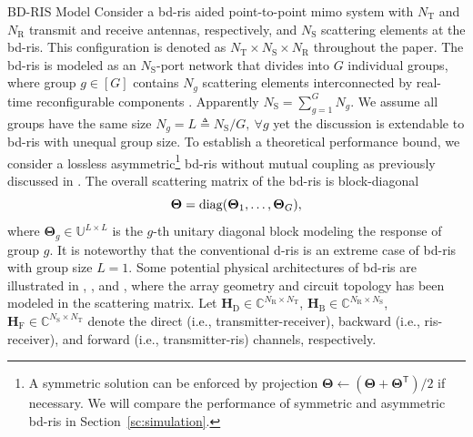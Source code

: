 	\begin{section}{BD-RIS Model}
	Consider a \gls{bd}-\gls{ris} aided point-to-point \gls{mimo} system with $N_\mathrm{T}$ and $N_\mathrm{R}$ transmit and receive antennas, respectively, and $N_\mathrm{S}$ scattering elements at the \gls{bd}-\gls{ris}.
	This configuration is denoted as $N_\mathrm{T} \times N_\mathrm{S} \times N_\mathrm{R}$ throughout the paper.
	The \gls{bd}-\gls{ris} is modeled as an $N_\mathrm{S}$-port network \cite{Ivrlac2010} that divides into $G$ individual groups, where group $g \in [G]$ contains $N_g$ scattering elements interconnected by real-time reconfigurable components \cite{Shen2020a}.
	Apparently $N_\mathrm{S} = \sum_{g=1}^G N_g$.
	We assume all groups have the same size $N_g = L \triangleq N_\mathrm{S} / G, \ \forall g$ yet the discussion is extendable to \gls{bd}-\gls{ris} with unequal group size.
	To establish a theoretical performance bound, we consider a lossless asymmetric\footnote{A symmetric solution can be enforced by projection $\mathbf{\Theta} \gets (\mathbf{\Theta} + \mathbf{\Theta}^\mathsf{T})/2$ if necessary. We will compare the performance of symmetric and asymmetric \gls{bd}-\gls{ris} in Section~\ref{sc:simulation}.} \gls{bd}-\gls{ris} without mutual coupling as previously discussed in \cite{Li2023b,Li2023c,Bartoli2023}.
	The overall scattering matrix of the \gls{bd}-\gls{ris} is block-diagonal
	\begin{equation}
		\mathbf{\Theta} = \operatorname{diag}(\mathbf{\Theta}_1,\ldots,\mathbf{\Theta}_G),
	\end{equation}
	where $\mathbf{\Theta}_g \in \mathbb{U}^{L \times L}$ is the $g$-th unitary diagonal block modeling the response of group $g$.
	It is noteworthy that the conventional \gls{d}-\gls{ris} is an extreme case of \gls{bd}-\gls{ris} with group size $L=1$.
	Some potential physical architectures of \gls{bd}-\gls{ris} are illustrated in \cite[Fig. 3]{Shen2020a}, \cite[Fig. 5]{Li2023c}, and \cite[Fig. 2]{Nerini2024}, where the
	array geometry and
	circuit topology has been modeled in the scattering matrix.
	Let $\mathbf{H}_\mathrm{D} \in \mathbb{C}^{N_\mathrm{R} \times N_\mathrm{T}}$, $\mathbf{H}_\mathrm{B} \in \mathbb{C}^{N_\mathrm{R} \times N_\mathrm{S}}$, $\mathbf{H}_\mathrm{F} \in \mathbb{C}^{N_\mathrm{S} \times N_\mathrm{T}}$ denote the direct (i.e., transmitter-receiver), backward (i.e., \gls{ris}-receiver), and forward (i.e., transmitter-\gls{ris}) channels, respectively.

\end{section}
